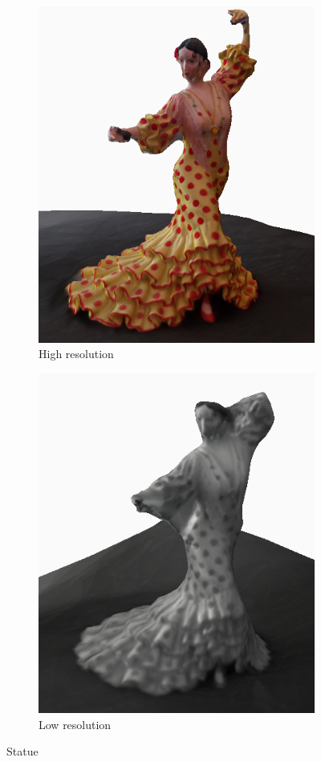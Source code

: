 \begin{figure}
\begin{subfigure}{.5\textwidth}
  \centering
  \includegraphics[width=0.8\linewidth]{images/statue-high.png}
  \caption{High resolution}
  \label{fig:statue-high}
\end{subfigure}
\begin{subfigure}{.5\textwidth}
  \centering
  \includegraphics[width=0.8\linewidth]{images/statue-low.png}
  \caption{Low resolution}
  \label{fig:statue-low}
\end{subfigure}
\caption{Statue}
\label{fig:statue}
\end{figure}

